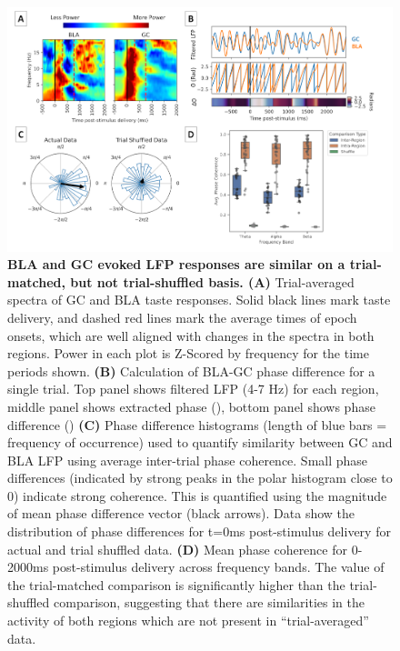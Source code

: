 \begin{refsection}
\begin{figure}
\includegraphics[width=\linewidth]{mahmood_22_figures/fig7-0.png}
\caption{\textbf{BLA and GC evoked LFP responses are similar on a trial-matched, but not trial-shuffled basis. (A)} Trial-averaged spectra of GC and BLA taste responses. Solid black lines mark taste delivery, and dashed red lines mark the average times of epoch onsets, which are well aligned with changes in the spectra in both regions. Power in each plot is Z-Scored by frequency for the time periods shown. \textbf{(B)} Calculation of BLA-GC phase difference for a single trial. Top panel shows filtered LFP (4-7 Hz) for each region, middle panel shows extracted phase (\Theta\)), bottom panel shows phase difference (\Delta\Theta\)) \textbf{(C)} Phase difference histograms (length of blue bars = frequency of occurrence) used to quantify similarity between GC and BLA LFP using average inter-trial phase coherence. Small phase differences (indicated by strong peaks in the polar histogram close to 0) indicate strong coherence. This is quantified using the magnitude of mean phase difference vector (black arrows). Data show the  distribution of phase differences for t=0ms post-stimulus delivery for actual and trial shuffled data. \textbf{(D)} Mean phase coherence for 0-2000ms post-stimulus delivery across frequency bands. The value of the trial-matched comparison is significantly higher than the trial-shuffled comparison, suggesting that there are similarities in the activity of both regions which are not present in “trial-averaged” data.}
\label{fig:wrapfig}
\end{figure}


\end{refsection}

